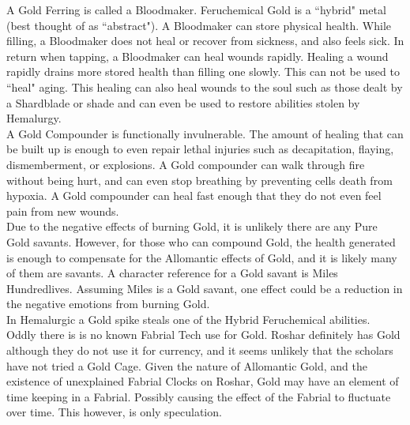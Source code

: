\documentclass[conference]{IEEEtran}
\begin{document}
A Gold Ferring is called a Bloodmaker.\cite{ARS}  Feruchemical Gold is a ``hybrid" metal (best thought of as ``abstract").\cite{FE-TB} A Bloodmaker can store physical health.\cite{ARS}  While filling, a Bloodmaker does not heal or recover from sickness, and also feels sick.\cite{AoL-CH12}  In return when tapping, a Bloodmaker can heal wounds rapidly.  Healing a wound rapidly drains more stored health than filling one slowly.\cite{AoL-CH9}  This can not be used to ``heal" aging.\cite{gd-age}  This healing can also heal wounds to the soul such as those dealt by a Shardblade\cite{gd-shard} or shade\cite{gd-shard} and can even be used to restore abilities stolen by Hemalurgy.\cite{gd-he}\\

A Gold Compounder is functionally invulnerable.  The amount of healing that can be built up is enough to even repair lethal injuries such as decapitation,\cite{gd-decap} flaying,\cite{TFE-CH38} dismemberment,\cite{TFE-CH38} or explosions.\cite{AoL-CH18}  A Gold compounder can walk through fire without being hurt,\cite{TFE-CH38} and can even stop breathing by preventing cells death from hypoxia.\cite{AoL-CH17}  A Gold compounder can heal fast enough that they do not even feel pain from new wounds.\cite{AoL-CH17}\\

Due to the negative effects of burning Gold, it is unlikely there are any Pure Gold savants.  However, for those who can compound Gold, the health generated is enough to compensate for the Allomantic effects of Gold, and it is likely many of them are savants.  A character reference for a Gold savant is Miles Hundredlives.\cite{miles-savant}  Assuming Miles is a Gold savant, one effect could be a reduction in the negative emotions from burning Gold.\cite{AoL-CH15}\\

In Hemalurgic a Gold spike steals one of the Hybrid Feruchemical abilities.\cite{HE-TB} \\

Oddly there is is no known Fabrial Tech use for Gold.  Roshar definitely has Gold although they do not use it for currency,\cite{OB-CH44} and it seems unlikely that the scholars have not tried a Gold Cage.  Given the nature of Allomantic Gold, and the existence of unexplained Fabrial Clocks on Roshar,\cite{WoR-CH12} Gold may have an element of time keeping in a Fabrial.  Possibly causing the effect of the Fabrial to fluctuate over time.  This however, is only speculation.
\end{document}
